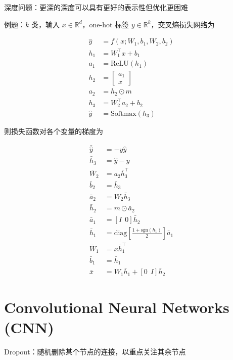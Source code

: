 \documentclass[openany,a4paper,12pt]{ctexbook}
\theoremstyle{kaiti}
\theoremstyle{normal}
\begin{document}
深度问题：更深的深度可以具有更好的表示性但优化更困难

例题：$k$ 类，输入 $x\in \mathbb{R} ^d$，one-hot 标签 $y\in \mathbb{R} ^k$，交叉熵损失网络为

\begin{equation}
\begin{aligned}
  \hat{y}&=f\left(x;W_1,b_1,W_2,b_2 \right)\\ 
  h_1&=W_{1}^{\top}x+b_1 \\
  a_1&=\mathrm{ReLU}\left(h_1 \right)\\
  h_2&=\begin{bmatrix}
    a_1\\ x
  \end{bmatrix} \\
  a_2&=h_2\odot m \\
  h_3&=W_{2}^{\top}a_2+b_2 \\
  \hat{y}&=\mathrm{Softmax}\left(h_3 \right)
\end{aligned}
\end{equation}

则损失函数对各个变量的梯度为

\begin{equation}
\begin{aligned}
  \bar{\hat{y}}&=-y\hat{y} \\
  \bar{h}_3&=\hat{y}-y \\
  \bar{W}_2&=a_2\bar{h}_{3}^{\top} \\
  \bar{b}_2&=\bar{h}_3 \\
  \bar{a}_2&=W_2\bar{h}_3\\
  \bar{h}_2&=m\odot \bar{a}_2 \\
  \bar{a}_1&=\left[I~~0 \right] \bar{h}_2 \\
  \bar{h}_1&=\mathrm{diag}\left[\frac{1+\mathrm{sgn} \left(h_1 \right)}{2}\right]\bar{a}_1\\
  \bar{W}_1&=x\bar{h}_{1}^{\top} \\
  \bar{b}_1&=\bar{h}_1 \\
  \bar{x}&=W_1\bar{h}_1+\left[0~~I\right] \bar{h}_2
\end{aligned}
\end{equation}

\section{Convolutional Neural Networks (CNN)}

Dropout：随机删除某个节点的连接，以重点关注其余节点
\end{document}
